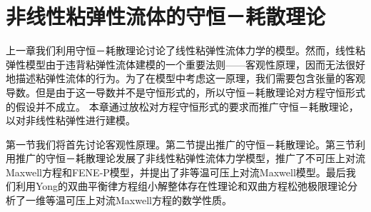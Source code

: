  \chapter{非线性粘弹性流体的守恒－耗散理论}

% 
上一章我们利用守恒－耗散理论讨论了线性粘弹性流体力学的模型。然而，线性粘弹性模型由于违背粘弹性流体建模的一个重要法则——客观性原理，因而无法很好地描述粘弹性流体的行为\cite{oldroyd1950formulation,dimitrienko2010nonlinear,edwards1990remarks}。为了在模型中考虑这一原理，我们需要包含张量的客观导数。但是由于这一导数并不是守恒形式的，所以守恒－耗散理论对方程守恒形式的假设并不成立。
本章通过放松对方程守恒形式的要求而推广守恒－耗散理论，以对非线性粘弹性进行建模。

第一节我们将首先讨论客观性原理。第二节提出推广的守恒－耗散理论。第三节利用推广的守恒－耗散理论发展了非线性粘弹性流体力学模型，推广了不可压上对流Maxwell方程和FENE-P模型，并提出了非等温可压上对流Maxwell模型。最后我们利用Yong的双曲平衡律方程组小解整体存在性理论和双曲方程松弛极限理论分析了一维等温可压上对流Maxwell方程的数学性质。

